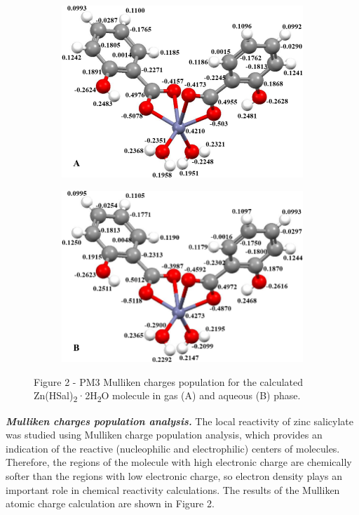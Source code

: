 \begin{figure}[H]
    \centering
    \begin{subfigure}[b]{0.45\textwidth}
        \centering
        \includegraphics[width=\textwidth]{assets/39}
    \end{subfigure}
    \hfill
    \begin{subfigure}[b]{0.45\textwidth}
        \centering
        \includegraphics[width=\textwidth]{assets/40}
    \end{subfigure}
    \caption*{Figure 2 - PM3 Mulliken charges population for the calculated Zn(HSal)\textsubscript{2}·2H\textsubscript{2}O molecule in gas (A) and aqueous (B) phase.}
\end{figure}

\begin{multicols}{2}
\emph{{\bfseries Mulliken charges population analysis.}} The local
reactivity of zinc salicylate was studied using Mulliken charge
population analysis, which provides an indication of the reactive
(nucleophilic and electrophilic) centers of molecules. Therefore, the
regions of the molecule with high electronic charge are chemically
softer than the regions with low electronic charge, so electron density
plays an important role in chemical reactivity calculations. The results
of the Mulliken atomic charge calculation are shown in Figure 2.
\end{multicols}

